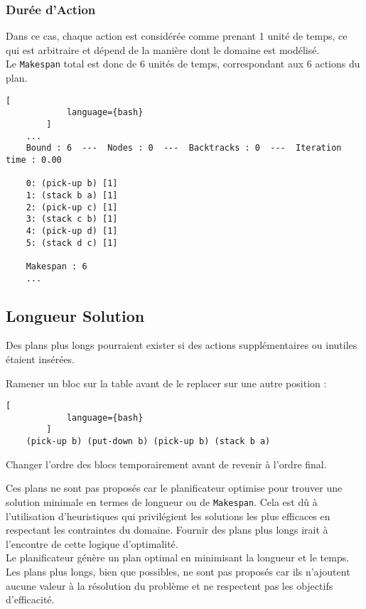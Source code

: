 \documentclass[../CSC_5RO16_TA_TP5.tex]{subfiles}
\begin{document}
\subsubsection{Durée d'Action}
\begin{resolution}
    Dans ce cas, chaque action est considérée comme prenant 1 unité de temps, ce qui est arbitraire et dépend de la manière dont le domaine est modélisé.\\

    Le \texttt{Makespan} total est donc de 6 unités de temps, correspondant aux 6 actions du plan.

    \begin{scriptsize}\mycode
        \begin{lstlisting}[
            language={bash}
        ]
    ...
    Bound : 6  ---  Nodes : 0  ---  Backtracks : 0  ---  Iteration time : 0.00
    
    0: (pick-up b) [1]
    1: (stack b a) [1]
    2: (pick-up c) [1]
    3: (stack c b) [1]
    4: (pick-up d) [1]
    5: (stack d c) [1]
    
    Makespan : 6
    ...
        \end{lstlisting}
    \end{scriptsize}
\end{resolution}

\subsection{Longueur Solution}
\begin{resolution}
    Des plans plus longs pourraient exister si des actions supplémentaires ou inutiles étaient insérées.
\end{resolution}
\begin{example}
    Ramener un bloc sur la table avant de le replacer sur une autre position :

    \begin{scriptsize}\mycode
        \begin{lstlisting}[
            language={bash}
        ]
    (pick-up b) (put-down b) (pick-up b) (stack b a)
        \end{lstlisting}
    \end{scriptsize}

    Changer l'ordre des blocs temporairement avant de revenir à l'ordre final.
\end{example}
\noindent Ces plans ne sont pas proposés car le planificateur optimise pour trouver une solution minimale en termes de longueur ou de \texttt{Makespan}. Cela est dû à l'utilisation d'heuristiques qui privilégient les solutions les plus efficaces en respectant les contraintes du domaine. Fournir des plans plus longs irait à l'encontre de cette logique d'optimalité.\\

\noindent Le planificateur génère un plan optimal en minimisant la longueur et le temps. Les plans plus longs, bien que possibles, ne sont pas proposés car ils n'ajoutent aucune valeur à la résolution du problème et ne respectent pas les objectifs d'efficacité.
\end{document}
